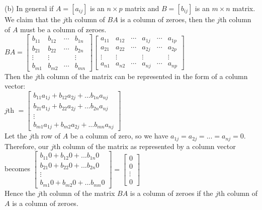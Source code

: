\documentclass[addpoints]{exam}
\begin{document}
\begin{sloppypar}
\begin{questions}
\begin{solution}
        \vspace{2mm}
        (b) In general if $ A = [a_{ij}] $ is an $ n \times p $ matrix and $ B = [b_{ij}] $ is an $ m \times n $ matrix. We claim that the $ j $th column of $BA$ is a column of zeroes, then the $ j $th column of $A$ must be a column of zeroes. \\ 
        $ BA = \begin{bmatrix}
            b_{11} & b_{12} & \cdots & b_{1n} \\ 
            b_{21} & b_{22} & \cdots & b_{2n} \\ 
            \vdots & \vdots & & \vdots \\ 
            b_{m1} & b_{m2} & \cdots & b_{mn}
        \end{bmatrix} \begin{bmatrix}
            a_{11} & a_{12} & \cdots & a_{1j} & \cdots & a_{1p} \\ 
            a_{21} & a_{22} & \cdots & a_{2j} & \cdots & a_{2p} \\ 
            \vdots & \vdots & & \vdots & & \vdots \\ 
            a_{n1} & a_{n2} & \cdots & a_{nj} & \cdots & a_{np} 
        \end{bmatrix}$ \\ 
        Then the $j$th column of the matrix can be represented in the form of a column vector: \\ 
        $ j $th $ = \begin{bmatrix}
            b_{11}a_{1j} + b_{12}a_{2j} + ... b_{1n}a_{nj} \\ 
            b_{21}a_{1j} + b_{22}a_{2j} + ... b_{2n}a_{nj} \\
            \vdots \\ 
            b_{m1}a_{1j} + b_{m2}a_{2j} + ... b_{mn}a_{nj}
        \end{bmatrix} $ \\ 
        Let the $j$th row of $A$ be a column of zero, so we have $ a_{1j} = a_{2j} = ... = a_{nj} = 0 $. \\ 
        Therefore, our $j$th column of the matrix as represented by a column vector becomes $ \begin{bmatrix}
            b_{11}0 + b_{12}0 + ... b_{1n}0 \\ 
            b_{21}0 + b_{22}0 + ... b_{2n}0 \\ 
            \vdots \\ 
            b_{m1}0 + b_{m2}0 + ... b_{mn}0
        \end{bmatrix} = \begin{bmatrix}
            0 \\ 0 \\ \vdots \\ 0
        \end{bmatrix}$ \\ Hence the $j$th column of the matrix $BA$ is a column of zeroes if the $j$th column of $A$ is a column of zeroes. 
    \end{solution}
    

\end{questions}
\end{sloppypar}
\end{document}
